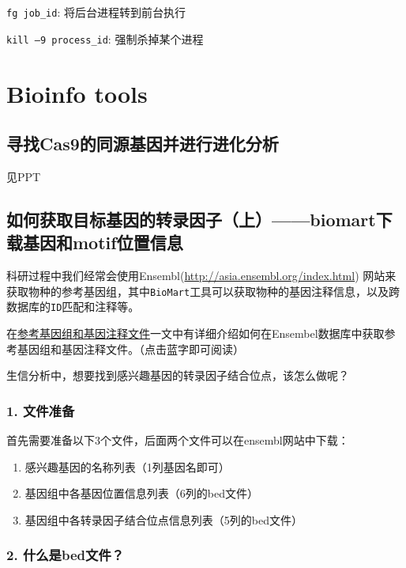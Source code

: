\documentclass[]{article}
\providecommand{\tightlist}{%
  \setlength{\itemsep}{0pt}\setlength{\parskip}{0pt}}
\numberwithin{figure}{section}
\numberwithin{table}{section}
\begin{document}
\texttt{fg\ job\_id}: 将后台进程转到前台执行

\texttt{kill\ –9\ process\_id}: 强制杀掉某个进程

\hypertarget{bioinfo-tools}{%
\section{Bioinfo tools}\label{bioinfo-tools}}

\hypertarget{cas9}{%
\subsection{寻找Cas9的同源基因并进行进化分析}\label{cas9}}

见PPT

\hypertarget{biomart_motif}{%
\subsection{如何获取目标基因的转录因子（上）------biomart下载基因和motif位置信息}\label{biomart_motif}}

科研过程中我们经常会使用Ensembl(\url{http://asia.ensembl.org/index.html}) 网站来获取物种的参考基因组，其中\texttt{BioMart}工具可以获取物种的基因注释信息，以及跨数据库的\texttt{ID}匹配和注释等。

在\href{https://mp.weixin.qq.com/s/2OoXy4f1t0hE8OUqsAt1kw}{参考基因组和基因注释文件}一文中有详细介绍如何在Ensembel数据库中获取参考基因组和基因注释文件。（点击蓝字即可阅读）

生信分析中，想要找到感兴趣基因的转录因子结合位点，该怎么做呢？

\hypertarget{biomart_motif_1}{%
\subsubsection{1. 文件准备}\label{biomart_motif_1}}

首先需要准备以下3个文件，后面两个文件可以在ensembl网站中下载：

\begin{enumerate}
\def\labelenumi{\arabic{enumi}.}
\tightlist
\item
  感兴趣基因的名称列表（1列基因名即可）
\item
  基因组中各基因位置信息列表（6列的bed文件）
\item
  基因组中各转录因子结合位点信息列表（5列的bed文件）
\end{enumerate}

\hypertarget{biomart_motif_2}{%
\subsubsection{2. 什么是bed文件？}\label{biomart_motif_2}}
\end{document}
